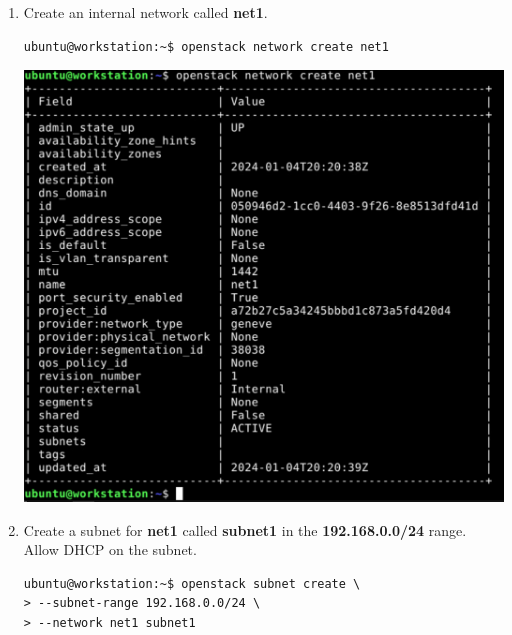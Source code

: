 \documentclass[letterpaper, 12pt]{article}
\begin{document}
\begin{enumerate}
    \item Create an internal network called \textbf{net1}.
\begin{lstlisting}
ubuntu@workstation:~$ openstack network create net1
\end{lstlisting}

    \begin{center}
        \includegraphics[width=\linewidth]{images/part1/step21.png}
    \end{center}

    \item Create a subnet for \textbf{net1} called \textbf{subnet1} in the \textbf{192.168.0.0/24} range. Allow DHCP on
    the subnet.
\begin{lstlisting}
ubuntu@workstation:~$ openstack subnet create \
> --subnet-range 192.168.0.0/24 \
> --network net1 subnet1
\end{lstlisting}


\end{enumerate}
\end{document}

